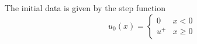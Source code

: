 \documentclass{article}
\theoremstyle{definition}
\numberwithin{equation}{section}
\begin{document}

The initial data is given by the step function
\begin{equation} \label{eqn:initial_data}
u_0(x) = \begin{cases}
0 & x < 0 \\
u^+ & x \geq 0
\end{cases}
\end{equation}




\end{document}
